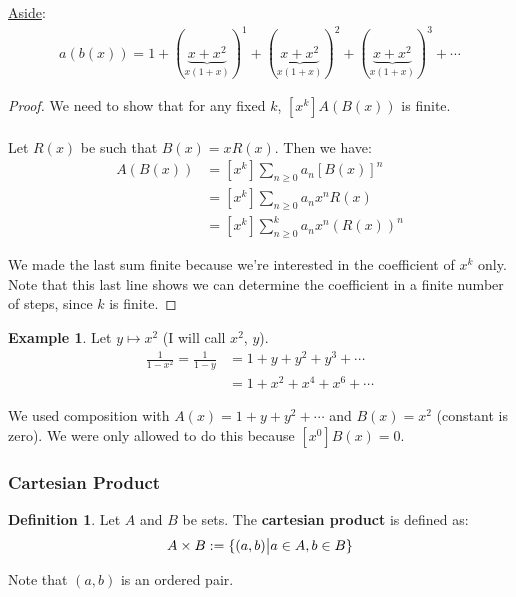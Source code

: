 \documentclass[]{article}
\theoremstyle{definition}
\newtheorem*{defn}{Definition}
\newtheorem{ex}{Example}[section]
\DeclarePairedDelimiter{\set}{\lbrace}{\rbrace}
\begin{document}
				\underline{Aside}:
				\begin{align*}
					a(b(x)) = 1 + (\underbrace{x + x^2}_{x(1+x)})^1 + (\underbrace{x + x^2}_{x(1+x)})^2 + (\underbrace{x + x^2}_{x(1+x)})^3 + \cdots
				\end{align*}

				\begin{proof}
					We need to show that for any fixed $k$, $[x^k]A(B(x))$ is finite.
					\\ \\
					Let $R(x)$ be such that $B(x) = xR(x)$. Then we have:
					\begin{align*}
						[x^k]A(B(x)) &= [x^k] \sum_{n \ge 0} a_n[B(x)]^n \\
						&= [x^k] \sum_{n \ge 0} a_n x^n R(x) \\
						&= [x^k] \sum_{n \ge 0}^{k} a_n x^n (R(x))^n
					\end{align*}

					We made the last sum finite because we're interested in the coefficient of $x^k$ only. Note that this last line shows we can determine the coefficient in a finite number of steps, since $k$ is finite.
				\end{proof}

				\begin{ex}
					Let $y \mapsto x^2$ (I will call $x^2$, $y$).
					\begin{align*}
						\frac{1}{1 - x^2} = \frac{1}{1 - y} &= 1 + y + y^2 + y^3 + \cdots \\
					&= 1 + x^2 + x^4 + x^6 + \cdots
					\end{align*}

					We used composition with $A(x) = 1 + y + y^2 + \cdots$ and $B(x) = x^2$ (constant is zero). We were only allowed to do this because $[x^0]B(x) = 0$.
				\end{ex}
			\subsubsection{Cartesian Product}
				\begin{defn}
					Let $A$ and $B$ be sets. The \textbf{cartesian product} is defined as:
					\begin{align*}
						A \times B := \set{(a, b) \big| a \in A, b \in B }
					\end{align*}

					Note that $(a, b)$ is an ordered pair.
				\end{defn}
\end{document}
